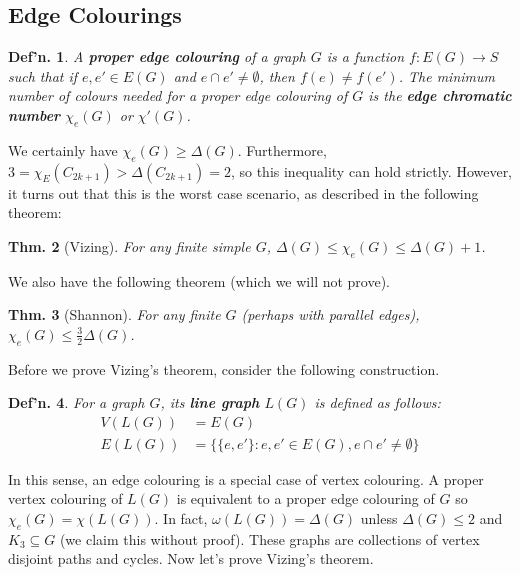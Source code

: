 \documentclass[12pt, a4paper]{book}
\newtheorem{theorem}{Thm.}[section]
\newtheorem{definition}[theorem]{Def'n.}
\theoremstyle{nonumberplain}
\begin{document}
\subsection{Edge Colourings}
\begin{definition}
    A \textbf{proper edge colouring} of a graph $G$ is a function $f:E(G)\to S$ such that if $e,e'\in E(G)$ and $e\cap e'\neq\emptyset$, then $f(e)\neq f(e')$.
    The minimum number of colours needed for a proper edge colouring of $G$ is the \textbf{edge chromatic number} $\chi_e(G)$ or $\chi'(G)$.
\end{definition}
We certainly have $\chi_e(G)\geq\Delta(G)$.
Furthermore, $3=\chi_E(C_{2k+1})>\Delta(C_{2k+1})=2$, so this inequality can hold strictly.
However, it turns out that this is the worst case scenario, as described in the following theorem:
\begin{theorem}[Vizing]
    For any finite simple $G$, $\Delta(G)\leq\chi_e(G)\leq\Delta(G)+1$.
\end{theorem}
We also have the following theorem (which we will not prove).
\begin{theorem}[Shannon]
    For any finite $G$ (perhaps with parallel edges), $\chi_e(G)\leq\frac{3}{2}\Delta(G)$.
\end{theorem}
Before we prove Vizing's theorem, consider the following construction.
\begin{definition}
    For a graph $G$, its \textbf{line graph} $L(G)$ is defined as follows:
    \begin{align*}
        V(L(G)) &= E(G)\\
        E(L(G)) &= \{ \{e,e'\}:e,e'\in E(G), e\cap e'\neq\emptyset\}
    \end{align*}
\end{definition}
In this sense, an edge colouring is a special case of vertex colouring.
A proper vertex colouring of $L(G)$ is equivalent to a proper edge colouring of $G$ so $\chi_e(G)=\chi(L(G))$.
In fact, $\omega(L(G))=\Delta(G)$ unless $\Delta(G)\leq 2$ and $K_3\subseteq G$ (we claim this without proof).
These graphs are collections of vertex disjoint paths and cycles.
Now let's prove Vizing's theorem.
\end{document}
